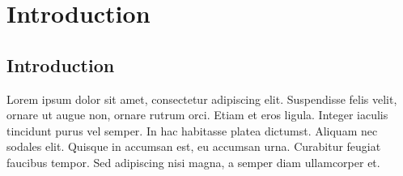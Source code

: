 \chapter{Introduction}
\label{Chapter1}

\section{Introduction} 
\label{sec:1.1}

Lorem ipsum dolor sit amet, consectetur adipiscing elit. Suspendisse felis velit, ornare ut augue non, ornare rutrum orci. Etiam et eros ligula. Integer iaculis tincidunt purus vel semper. In hac habitasse platea dictumst. Aliquam nec sodales elit. Quisque in accumsan est, eu accumsan urna. Curabitur feugiat faucibus tempor. Sed adipiscing nisi magna, a semper diam ullamcorper et.


